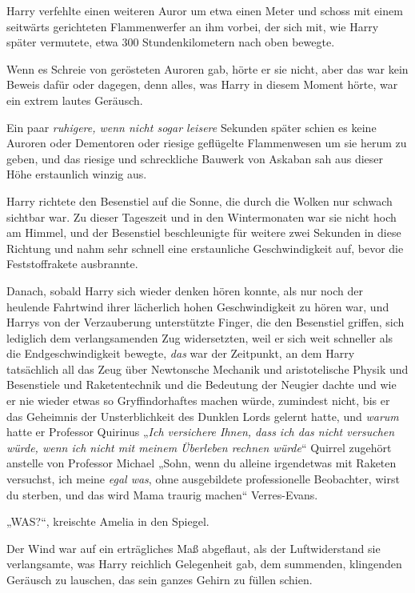 {Harry verfehlte einen weiteren Auror um etwa einen Meter und schoss mit einem seitwärts gerichteten Flammenwerfer an ihm vorbei, der sich mit, wie Harry später vermutete, etwa 300 Stundenkilometern nach oben bewegte.

Wenn es Schreie von gerösteten Auroren gab, hörte er sie nicht, aber das war kein Beweis dafür oder dagegen, denn alles, was Harry in diesem Moment hörte, war ein extrem lautes Geräusch.

Ein paar \emph{ruhigere, wenn nicht sogar leisere} Sekunden später schien es keine Auroren oder Dementoren oder riesige geflügelte Flammenwesen um sie herum zu geben, und das riesige und schreckliche Bauwerk von Askaban sah aus dieser Höhe erstaunlich winzig aus.

Harry richtete den Besenstiel auf die Sonne, die durch die Wolken nur schwach sichtbar war. Zu dieser Tageszeit und in den Wintermonaten war sie nicht hoch am Himmel, und der Besenstiel beschleunigte für weitere zwei Sekunden in diese Richtung und nahm sehr schnell eine erstaunliche Geschwindigkeit auf, bevor die Feststoffrakete ausbrannte.

Danach, sobald Harry sich wieder denken hören konnte, als nur noch der heulende Fahrtwind ihrer lächerlich hohen Geschwindigkeit zu hören war, und Harrys von der Verzauberung unterstützte Finger, die den Besenstiel griffen, sich lediglich dem verlangsamenden Zug widersetzten, weil er sich weit schneller als die Endgeschwindigkeit bewegte, \emph{das} war der Zeitpunkt, an dem Harry tatsächlich all das Zeug über Newtonsche Mechanik und aristotelische Physik und Besenstiele und Raketentechnik und die Bedeutung der Neugier dachte und wie er nie wieder etwas so Gryffindorhaftes machen würde, zumindest nicht, bis er das Geheimnis der Unsterblichkeit des Dunklen Lords gelernt hatte, und \emph{warum} hatte er Professor Quirinus „\emph{Ich versichere Ihnen, dass ich das nicht versuchen würde, wenn ich nicht mit meinem Überleben rechnen würde}“ Quirrel zugehört anstelle von Professor Michael „Sohn, wenn du alleine irgendetwas mit Raketen versuchst, ich meine \emph{egal was}, ohne ausgebildete professionelle Beobachter, wirst du sterben, und das wird Mama traurig machen“ Verres-Evans.

„WAS?“, kreischte Amelia in den Spiegel.

Der Wind war auf ein erträgliches Maß abgeflaut, als der Luftwiderstand sie verlangsamte, was Harry reichlich Gelegenheit gab, dem summenden, klingenden Geräusch zu lauschen, das sein ganzes Gehirn zu füllen schien.

}
